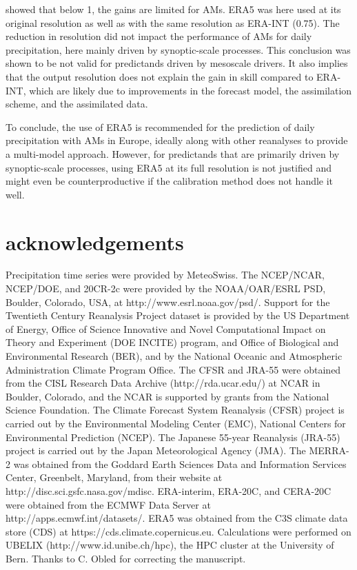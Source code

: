 \documentclass[alpha-refs]{wiley-article}
\begin{document}
\citet{Horton2018b} showed that below 1\degree, the gains are limited for AMs. ERA5 was here used at its original resolution as well as with the same resolution as ERA-INT (0.75\degree). The reduction in resolution did not impact the performance of AMs for daily precipitation, here mainly driven by synoptic-scale processes. This conclusion was shown to be not valid for predictands driven by mesoscale drivers. It also implies that the output resolution does not explain the gain in skill compared to ERA-INT, which are likely due to improvements in the forecast model, the assimilation scheme, and the assimilated data.

To conclude, the use of ERA5 is recommended for the prediction of daily precipitation with AMs in Europe, ideally along with other reanalyses to provide a multi-model approach. However, for predictands that are primarily driven by synoptic-scale processes, using ERA5 at its full resolution is not justified and might even be counterproductive if the calibration method does not handle it well.



\section*{acknowledgements}
Precipitation time series were provided by MeteoSwiss. The NCEP/NCAR, NCEP/DOE, and 20CR-2c were provided by the NOAA/OAR/ESRL PSD, Boulder, Colorado, USA, at http://www.esrl.noaa.gov/psd/. Support for the Twentieth Century Reanalysis Project dataset is provided by the US Department of Energy, Office of Science Innovative and Novel Computational Impact on Theory and Experiment (DOE INCITE) program, and Office of Biological and Environmental Research (BER), and by the National Oceanic and Atmospheric Administration Climate Program Office. The CFSR and JRA-55 were obtained from the CISL Research Data Archive (http://rda.ucar.edu/) at NCAR in Boulder, Colorado, and the NCAR is supported by grants from the National Science Foundation. The Climate Forecast System Reanalysis (CFSR) project is carried out by the Environmental Modeling Center (EMC), National Centers for Environmental Prediction (NCEP). The Japanese 55-year Reanalysis (JRA-55) project is carried out by the Japan Meteorological Agency (JMA). The MERRA-2 was obtained from the Goddard Earth Sciences Data and Information Services Center, Greenbelt, Maryland, from their website at http://disc.sci.gsfc.nasa.gov/mdisc. ERA-interim, ERA-20C, and CERA-20C were obtained from the ECMWF Data Server at http://apps.ecmwf.int/datasets/. ERA5 was obtained from the C3S climate data store (CDS) at https://cds.climate.copernicus.eu. Calculations were performed on UBELIX (http://www.id.unibe.ch/hpc), the HPC cluster at the University of Bern. Thanks to C. Obled for correcting the manuscript.
\end{document}
